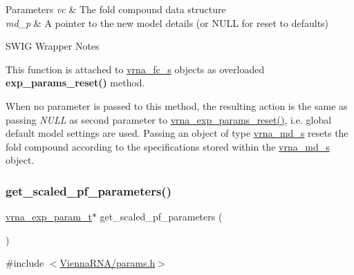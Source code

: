 \begin{DoxyParams}{Parameters}
{\em vc} & The fold compound data structure \\
\hline
{\em md\+\_\+p} & A pointer to the new model details (or N\+U\+LL for reset to defaults)\\
\hline
\end{DoxyParams}
\begin{DoxyRefDesc}{S\+W\+I\+G Wrapper Notes}
\item[\hyperlink{wrappers__wrappers000082}{S\+W\+I\+G Wrapper Notes}]This function is attached to \hyperlink{group__fold__compound_structvrna__fc__s}{vrna\+\_\+fc\+\_\+s} objects as overloaded {\bfseries exp\+\_\+params\+\_\+reset()} method.

When no parameter is passed to this method, the resulting action is the same as passing {\itshape N\+U\+LL} as second parameter to \hyperlink{group__energy__parameters_gaa5409218068be84d7b50c78fbdaa85a9}{vrna\+\_\+exp\+\_\+params\+\_\+reset()}, i.\+e. global default model settings are used. Passing an object of type \hyperlink{group__model__details_structvrna__md__s}{vrna\+\_\+md\+\_\+s} resets the fold compound according to the specifications stored within the \hyperlink{group__model__details_structvrna__md__s}{vrna\+\_\+md\+\_\+s} object. \end{DoxyRefDesc}
\mbox{\label{group__energy__parameters_gabf3b9271c41dd3fac02d56e0b02b3344}} 
\subsubsection{\texorpdfstring{get\+\_\+scaled\+\_\+pf\+\_\+parameters()}{get\_scaled\_pf\_parameters()}}
{\footnotesize\ttfamily \hyperlink{group__energy__parameters_ga01d8b92fe734df8d79a6169482c7d8d8}{vrna\+\_\+exp\+\_\+param\+\_\+t}$\ast$ get\+\_\+scaled\+\_\+pf\+\_\+parameters (\begin{DoxyParamCaption}\item[{void}]{ }\end{DoxyParamCaption})}



{\ttfamily \#include $<$\hyperlink{params_8h}{Vienna\+R\+N\+A/params.\+h}$>$}

